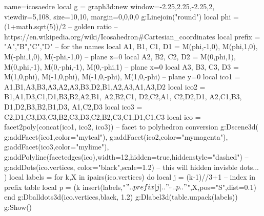 \documentclass{standalone}
\begin{document}
    \begin{luadraw}{name=icosaedre}
    local g = graph3d:new{ 
        window={-2.25,2.25,-2.25,2},
        viewdir={5,108}, 
        size={10,10}, 
        margin={0,0,0,0}
    }
    g:Linejoin("round")
    local phi = (1+math.sqrt(5))/2   -- golden ratio
    -- https://en.wikipedia.org/wiki/Icosahedron#Cartesian_coordinates
    local prefix = {"A","B","C","D"}    -- for the names
    local A1, B1, C1, D1 = M(phi,-1,0), M(phi,1,0), M(-phi,1,0), M(-phi,-1,0)   -- plane z=0
    local A2, B2, C2, D2 = M(0,phi,1), M(0,phi,-1), M(0,-phi,-1), M(0,-phi,1)   -- plane x=0
    local A3, B3, C3, D3 = M(1,0,phi), M(-1,0,phi), M(-1,0,-phi), M(1,0,-phi)   -- plane y=0
    local ico1 = {
        {A1,B1,A3},{B3,A3,A2},{A3,B3,D2},{B1,A2,A3},{A1,A3,D2}
    }
    local ico2 = {
        {B1,A1,D3},{C1,D1,B3},{B2,A2,B1}, {A2,B2,C1}, {D2,C2,A1}, {C2,D2,D1}, {A2,C1,B3}, {D1,D2,B3},{B2,B1,D3}, {A1,C2,D3}
    }
    local ico3 = {
        {C2,D1,C3},{D3,C3,B2},{C3,D3,C2},{B2,C3,C1},{D1,C1,C3}
    }
    local ico = facet2poly(concat(ico1, ico2, ico3)) -- facet to polyhedron conversion
    g:Dscene3d( 
        g:addFacet(ico1,{color="myteal"}),
        g:addFacet(ico2,{color="mymagenta"}),
        g:addFacet(ico3,{color="mylime"}),
        g:addPolyline(facetedges(ico),{width=12,hidden=true,hiddenstyle="dashed"})
        --g:addDots(ico.vertices, {color="black",scale=1.2}) -- this will hidden invisble dots...
    )
    local labels = {}
    for k,X in ipairs(ico.vertices) do
        local j = (k-1)//3+1 -- index in prefix table
        local p = (k%
        insert(labels,{"$"..prefix[j].."_"..p.."$",X,{pos="S",dist=0.1}})
    end
    g:Dballdots3d(ico.vertices,black, 1.2)
    g:Dlabel3d(table.unpack(labels))
    g:Show() 
    \end{luadraw}
\end{document}
